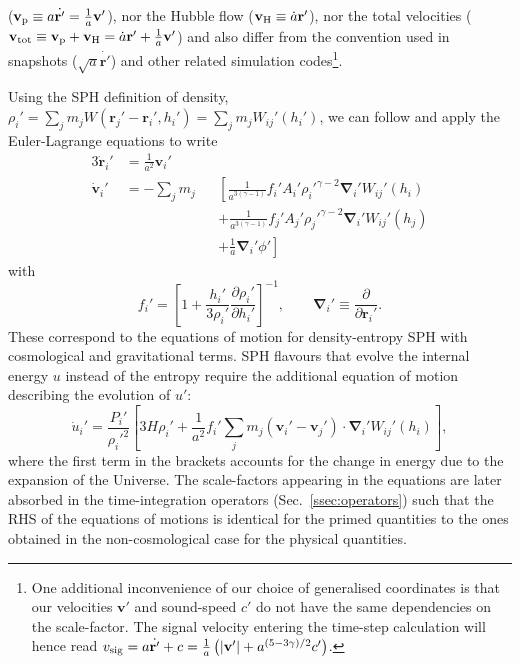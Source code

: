 ($\mathbf{v}_{\rm p} \equiv a\dot{\mathbf{r}'} =
\frac{1}{a}\mathbf{v}'$), nor the Hubble flow
($\mathbf{v}_{\rm H} \equiv \dot{a}\mathbf{r}'$), nor the total
velocities
($\mathbf{v}_{\rm tot} \equiv \mathbf{v}_{\rm p} + \mathbf{v}_{\rm H}
= \dot{a}\mathbf{r}' + \frac{1}{a}\mathbf{v}'$) and also differ from
the convention used in \gadget snapshots
($\sqrt{a} \dot{\mathbf{r}'}$) and other related simulation
codes\footnote{One additional inconvenience of our choice of
  generalised coordinates is that our velocities $\mathbf{v}'$ and
  sound-speed $c'$ do not have the same dependencies on the
  scale-factor. The signal velocity entering the time-step calculation
  will hence read
  $v_{\rm sig} = a\dot{\mathbf{r}'} + c = \frac{1}{a} \left(
    |\mathbf{v}'| + a^{(5 - 3\gamma)/2}c'\right)$.}.

Using the SPH definition of density,
$\rho_i' = \sum_jm_jW(\mathbf{r}_{j}'-\mathbf{r}_{i}',h_i') =
\sum_jm_jW_{ij}'(h_i')$, we can follow \cite{Price2012} and apply the
Euler-Lagrange equations to write
\begin{alignat}{3}
  \dot{\mathbf{r}}_i'&= \frac{1}{a^2} \mathbf{v}_i'&  \label{eq:cosmo_eom_r} \\
  \dot{\mathbf{v}}_i' &= -\sum_j m_j &&\left[\frac{1}{a^{3(\gamma-1)}}f_i'A_i'\rho_i'^{\gamma-2}\mathbf{\nabla}_i'W_{ij}'(h_i)\right. \nonumber\\
  &   && + \left. \frac{1}{a^{3(\gamma-1)}}f_j'A_j'\rho_j'^{\gamma-2}\mathbf{\nabla}_i'W_{ij}'(h_j)\right. \nonumber\\
  &   && + \left. \frac{1}{a}\mathbf{\nabla}_i'\phi'\right] \label{eq:cosmo_eom_v}
\end{alignat}
with
\begin{equation}
    f_i' = \left[1 + \frac{h_i'}{3\rho_i'}\frac{\partial
      \rho_i'}{\partial h_i'}\right]^{-1}, \qquad \mathbf{\nabla}_i'
  \equiv \frac{\partial}{\partial \mathbf{r}_{i}'}. \nonumber
\end{equation}
These correspond to the equations of motion for density-entropy SPH
\citep[e.g. eq. 14 of][]{Hopkins2013} with cosmological and
gravitational terms. SPH flavours that evolve the internal energy $u$ instead of the
entropy require the additional equation of motion describing the evolution of
$u'$:
\begin{equation}
  \dot{u}_i' = \frac{P_i'}{\rho_i'^2}\left[3H\rho_i' + \frac{1}{a^2}f_i'\sum_jm_j\left(\mathbf{v}_i' -
    \mathbf{v}_j'\right)\cdot\mathbf{\nabla}_i'W_{ij}'(h_i)\right],
  \label{eq:cosmo_eom_u}
\end{equation}
where the first term in the brackets accounts for the change in energy
due to the expansion of the Universe. The scale-factors appearing in
the equations are later absorbed in the time-integration operators
(Sec.~\ref{ssec:operators}) such that the RHS of the equations of
motions is identical for the primed quantities to the ones obtained in
the non-cosmological case for the physical quantities.

